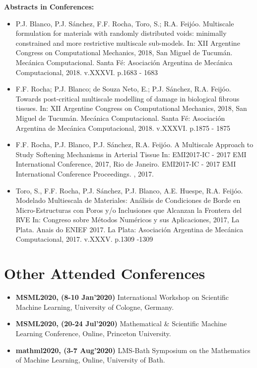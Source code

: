 \documentclass[letterpaper]{twentysecondcv} %
\begin{document}
\item \textbf{Abstracts in Conferences:} 
\begin{itemize}
	\item P.J. Blanco, P.J. Sánchez, F.F. Rocha, Toro, S.; R.A. Feijóo.
	Multiscale formulation for materials with randomly distributed voids: minimally constrained and more restrictive multiscale sub-models. In: XII Argentine Congress on
	Computational Mechanics, 2018, San Miguel de Tucumán.
	Mecánica Computacional. Santa Fé: Asociación Argentina de Mecánica Computacional, 2018. v.XXXVI.
	p.1683 - 1683
	\item F.F. Rocha; P.J. Blanco; de Souza Neto, E.; P.J. Sánchez, R.A. Feijóo.
	Towards post-critical multiscale modelling of damage in biological fibrous tissues.
	In: XII Argentine Congress on Computational Mechanics, 2018, San Miguel de Tucumán.
	Mecánica Computacional. Santa Fé: Asociación Argentina de Mecánica Computacional, 2018. v.XXXVI.
	p.1875 - 1875
	\item F.F. Rocha, P.J. Blanco, P.J. Sánchez, R.A. Feijóo.
	A Multiscale Approach to Study Softening Mechanisms in Arterial Tissue In: EMI2017-IC - 2017 EMI
	International Conference, 2017, Rio de Janeiro. EMI2017-IC - 2017 EMI International Conference Proceedings. , 2017.
	\item Toro, S., F.F. Rocha, P.J. Sánchez, P.J. Blanco, A.E. Huespe, R.A. Feijóo.
	Modelado Multiescala de Materiales: Análisis de Condiciones de Borde en Micro-Estructuras con Poros y/o
	Inclusiones que Alcanzan la Frontera del RVE In: Congreso sobre Métodos Numéricos y sus Aplicaciones,
	2017, La Plata. Anais do ENIEF 2017. La Plata: Asociación Argentina de Mecánica Computacional, 2017. v.XXXV. p.1309 -1309
\end{itemize}


\newpage

\makeprofile

\section{Other Attended Conferences}
\begin{itemize} 
 \item \textbf{MSML2020, (8-10 Jan'2020)} International Workshop on Scientific Machine Learning, University of Cologne, Germany.
\item \textbf{MSML2020, (20-24 Jul'2020)}  Mathematical & Scientific Machine Learning Conference,
 Online, Princeton University.
\item \textbf{mathml2020, (3-7 Aug'2020)}  LMS-Bath Symposium on the Mathematics of Machine Learning, Online, University of Bath. 
\end{itemize}
\end{document}
